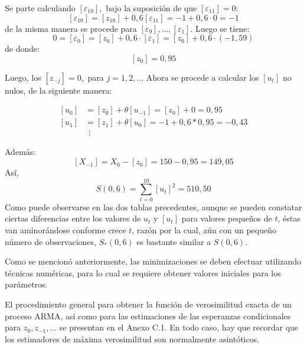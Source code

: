 \begin{ejemplo}
Se parte calculando $\left[ {\varepsilon_{10} } \right],$ bajo la suposici\'{o}n de que $\left[ {\varepsilon_{11} } \right]=0$:
\[
\left[ {\varepsilon_{10} } \right]=\left[ {z_{10} } \right]+0,6\left[ {\varepsilon_{11} } \right]=-1+0,6\cdot 0=-1
\]
de la misma manera se procede para $\left[ {\varepsilon_{9} } \right],\ldots,\left[ {\varepsilon_{1} } \right].$ Luego se tiene:
\[
0=\left[ {\varepsilon_{0} } \right]=\left[ {z_{0} } \right]+0,6\cdot \left[ 
{\varepsilon_{1} } \right]=\left[ {z_{0} } \right]+0,6\cdot \left( {-1,59} 
\right)
\]
de donde:
\[
\left[ {z_{0} } \right]=0,95
\]

Luego, los $\left[ {z_{-j} } \right]=0,$ para $j=1,2,\ldots$ Ahora se procede a calcular los $\left[ {u_{t} } \right]$ no nulos, de la siguiente manera:

\begin{align*}
\left[ {u_{0} } \right]&=\left[ {z_{0} } \right]+\theta \left[ {u_{-1} } 
\right]=\left[ {z_{0} } \right]+0=0,95 \\ 
 \left[ {u_{1} } \right]&=\left[ {z_{1} } \right]+\theta \left[ {u_{0} } 
\right]=-1+0,6\ast 0,95=-0,43 \\ 
 &\ \ \vdots 
\end{align*}

Adem\'{a}s:
\[
\left[ {X_{-1} } \right]=X_{0} -\left[ {z_{0} } \right]=150-0,95=149,05
\]
As\'{i},
\[
S\left( {0,6} \right)=\sum_{t=0}^{10} {\left[ {u_{t} } 
\right]^{2}=510,50} 
\]
Como puede observarse en las dos tablas precedentes, aunque se pueden constatar ciertas diferencias entre los valores de $u_{t}$ y $\left[ {u_{t} } \right]$ para valores peque\~{n}os de $t$, \'{e}stas van aminor\'{a}ndose conforme crece $t$, raz\'{o}n por la cual, a\'{u}n con un peque\~{n}o n\'{u}mero de observaciones, $S_{\ast } (0,6)$ es bastante similar a $S\left( {0,6} \right)$.\newline

Como se mencion\'{o} anteriormente, las minimizaciones se deben efectuar utilizando t\'{e}cnicas num\'{e}ricas, para lo cual se requiere obtener valores iniciales para los par\'{a}metros.\newline

El procedimiento general para obtener la funci\'{o}n de verosimilitud exacta de un proceso ARMA, as\'{i} como para las estimaciones de las esperanzas condicionales para $z_{0} ,z_{-1} ,\ldots $ se presentan en el Anexo C.1. En todo caso, hay que recordar que los estimadores de m\'{a}xima verosimilitud son normalmente asint\'{o}ticos.
\end{ejemplo}


